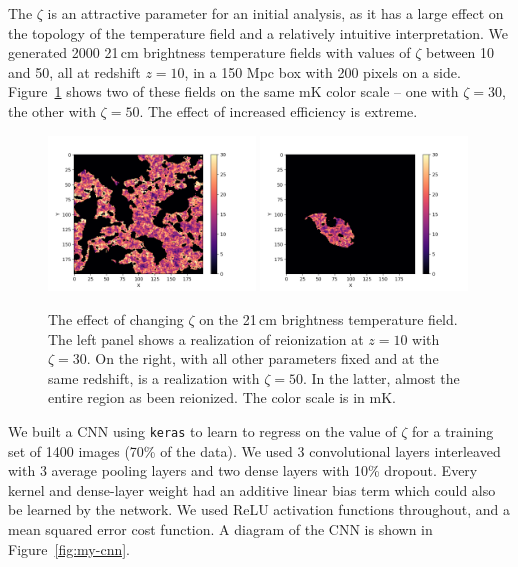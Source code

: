 The $\zeta$ is an attractive parameter for an initial analysis, as it has a large effect on the topology of the temperature field and a relatively intuitive interpretation. We generated 2000 21\,cm brightness temperature fields with values of $\zeta$ between 10 and 50, all at redshift $z=10$, in a 150 Mpc box with 200 pixels on a side. Figure~\ref{fig:zeta-30-50} shows two of these fields on the same mK color scale -- one with $\zeta=30$, the other with $\zeta=50$. The effect of increased efficiency is extreme.

\begin{figure}
\centering
\includegraphics[width=0.49\textwidth]{chapters/hera_ml/figures/zeta30.png}
\includegraphics[width=0.49\textwidth]{chapters/hera_ml/figures/zeta50.png}
\caption[The effect of changing $\zeta$ on the 21\,cm brightness temperature field.]{The effect of changing $\zeta$ on the 21\,cm brightness temperature field. The left panel shows a realization of reionization at $z=10$ with $\zeta=30$. On the right, with all other parameters fixed and at the same redshift, is a realization with $\zeta=50$. In the latter, almost the entire region as been reionized. The color scale is in mK.}
\label{fig:zeta-30-50}
\end{figure}

We built a CNN using {\tt keras} \citep{keras} to learn to regress on the value of $\zeta$ for a training set of 1400 images (70\% of the data). We used 3 convolutional layers interleaved with 3 average pooling layers and two dense layers with 10\% dropout. Every kernel and dense-layer weight had an additive linear bias term which could also be learned by the network. We used ReLU activation functions throughout, and a mean squared error cost function. A diagram of the CNN is shown in Figure~\ref{fig:my-cnn}.

